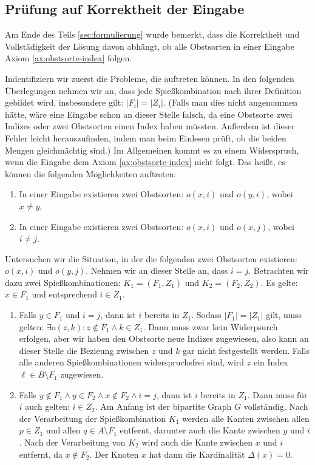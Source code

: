 \subsection{Prüfung auf Korrektheit der Eingabe}\label{sec:korrektheit-eingabe}
Am Ende des Teils \ref{sec:formulierung} wurde bemerkt, dass die Korrektheit und Vollstädigkeit
der Lösung davon abhängt, ob alle Obstsorten in einer Eingabe Axiom \ref{ax:obstsorte-index} folgen.

Indentifiziern wir zuerst die Probleme, die auftreten können.
In den folgenden Überlegungen nehmen wir an, dass jede Spießkombination nach
ihrer Definition gebildet wird, insbesondere gilt: $|F_i| = |Z_i|$.
(Falls man dies nicht angenommen hätte, wäre eine Eingabe schon an dieser Stelle
falsch, da eine Obstsorte zwei Indizes oder zwei Obstsorten einen Index haben müssten.
Außerdem ist dieser Fehler leicht herauszufinden, indem man beim Einlesen prüft,
ob die beiden Mengen gleichmächtig sind.)
Im Allgemeinen kommt es zu einem Widerspruch, wenn die Eingabe
dem Axiom \ref{ax:obstsorte-index} nicht folgt. 
Das heißt, es können die folgenden 
Möglichkeiten auftreten:
\begin{enumerate}[label={(P\arabic*)}]
  \item In einer Eingabe existieren zwei Obstsorten: $o(x, i)$ und $o(y, i)$, wobei $x \neq y$,\label{probleme1}
  \item In einer Eingabe existieren zwei Obstsorten: $o(x, i)$ und $o(x, j)$, wobei $i \neq j$.\label{probleme2}
\end{enumerate}

Untersuchen wir die Situation, in der die folgenden 
zwei Obstsorten existieren: $o(x, i)$ und $o(y, j)$.
Nehmen wir an dieser Stelle an, dass $i=j$.
Betrachten wir dazu zwei Spießkombinationen: $K_1 = (F_1, Z_1)$ und $K_2 = (F_2, Z_2)$.
Es gelte: $x \in F_1$ und entsprechend $i \in Z_1$.
\begin{enumerate}[label={\upshape(F\arabic*)}]
  \item Falls $y \in F_1$ und $i = j$, dann ist $i$ bereits in $Z_1$. Sodass $|F_1| = |Z_1|$ gilt,
  muss gelten: $\exists o(z, k) : z \notin F_1 \land k \in Z_1$.
  Dann muss zwar kein Widerpsurch erfolgen, aber wir haben den Obstsorte neue Indizes zugewiesen,
  also kann an dieser Stelle die Bezieung zwischen $z$ und $k$ gar nicht festgestellt werden.
  Falls alle anderen Spießkombinationen widerspruchsfrei sind,
  wird $z$ ein Index $\ell \in B \setminus F_1$ zugewiesen.\label{fall1}
  \item Falls $y \notin F_1 \land y \in F_2 \land x \notin F_2 \land i =j$, dann ist $i$ bereits in $Z_1$.
  Dann muss für $i$ auch gelten: $i \in Z_2$. Am Anfang ist der bipartite Graph $G$ vollständig.
  Nach der Verarbeitung der Spießkombination $K_1$ werden alle Kanten zwischen allen
  $p \in Z_1$ und allen $q \in A \setminus F_1$ entfernt, darunter auch die Kante zwischen
  $y$ und $i$. Nach der Verarbeitung von $K_2$ wird auch die Kante zwischen $x$ und $i$
  entfernt, da $x \notin F_2$. Der Knoten $x$ hat dann die Kardinalität $\Delta(x) = 0$.\label{fall2}
\end{enumerate}


